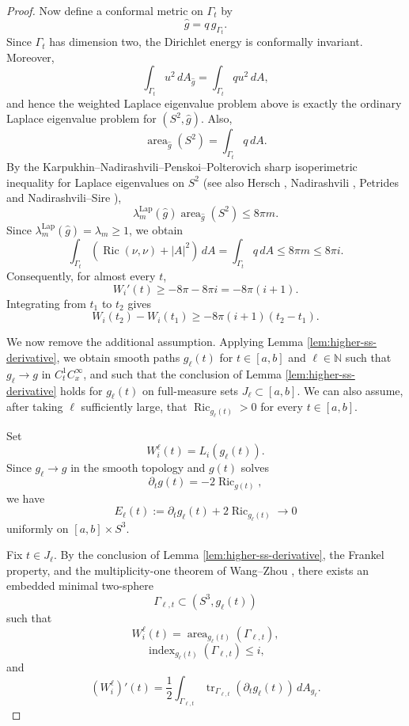 \documentclass[12pt,english]{amsart}
\theoremstyle{definition}
\begin{document}
\begin{proof}
Now define a conformal metric on \(\Gamma_t\) by
\[
\widehat g=q\,g_{\Gamma_t}.
\]
Since $\Gamma_t$ has dimension two, the Dirichlet energy is conformally invariant. Moreover,
\[
\int_{\Gamma_t}u^2\,dA_{\widehat g}
=
\int_{\Gamma_t}q u^2\,dA,
\]
and hence the weighted Laplace eigenvalue problem above is exactly the ordinary Laplace eigenvalue problem for \((S^2,\widehat g)\). Also,
\[
\operatorname{area}_{\widehat g}(S^2)
=
\int_{\Gamma_t}q\,dA.
\]
By the Karpukhin--Nadirashvili--Penskoi--Polterovich sharp isoperimetric inequality for Laplace eigenvalues on \(S^2\) \cite{KNPP} (see also Hersch \cite{He}, Nadirashvili \cite{N}, Petrides \cite{P} and Nadirashvili--Sire \cite{NS}),
\[
\lambda^{\operatorname{Lap}}_m(\widehat g)\operatorname{area}_{\widehat g}(S^2)\le 8\pi m.
\]
Since \(\lambda^{\operatorname{Lap}}_m(\widehat g) = \lambda_m \ge 1\), we obtain
\[
\int_{\Gamma_t}
\left(\operatorname{Ric}(\nu,\nu)+|A|^2\right)\,dA
=
\int_{\Gamma_t}q\,dA
\le 8\pi m
\le 8\pi i.
\]
Consequently, for almost every \(t\),
\[
W_i'(t)
\ge
-8\pi-8\pi i
=
-8\pi(i+1).
\]
Integrating from \(t_1\) to \(t_2\) gives
\[
W_i(t_2)-W_i(t_1)
\ge
-8\pi(i+1)(t_2-t_1).
\]

We now remove the additional assumption. Applying Lemma \ref{lem:higher-ss-derivative}, we obtain smooth paths \(g_\ell(t)\)
for \(t\in[a,b]\) and \(\ell \in \mathbb{N}\) such that \(g_\ell\to g\) in \(C^1_tC^\infty_x\), and such that the conclusion of Lemma \ref{lem:higher-ss-derivative} holds for \(g_\ell(t)\) on full-measure sets \(J_\ell\subset[a,b]\). We can also assume, after taking
\(\ell\) sufficiently large, that \(\operatorname{Ric}_{g_\ell(t)}>0\)
for every \(t\in[a,b]\).

Set
\[
W_i^\ell(t)=L_i(g_\ell(t)).
\]
Since \(g_\ell\to g\) in the smooth topology and \(g(t)\) solves
\[
\partial_t g(t)=-2\operatorname{Ric}_{g(t)},
\]
we have
\[
E_\ell(t):=\partial_t g_\ell(t)+2\operatorname{Ric}_{g_\ell(t)}
\to 0
\]
uniformly on \([a,b]\times S^3\).

Fix \(t\in J_\ell\). By the conclusion of Lemma \ref{lem:higher-ss-derivative}, the Frankel property, and the multiplicity-one theorem of Wang--Zhou \cite{WZ}, there exists an embedded minimal
two-sphere
\[
\Gamma_{\ell,t}\subset (S^3,g_\ell(t))
\]
such that
\[
W_i^\ell(t)=\operatorname{area}_{g_\ell(t)}(\Gamma_{\ell,t}),
\]
\[
\operatorname{index}_{g_\ell(t)}(\Gamma_{\ell,t})\le i,
\]
and
\[
(W_i^\ell)'(t)
=
\frac12
\int_{\Gamma_{\ell,t}}
\operatorname{tr}_{\Gamma_{\ell,t}}(\partial_t g_\ell(t))\,dA_{g_\ell}.
\]


\end{proof}
\end{document}
